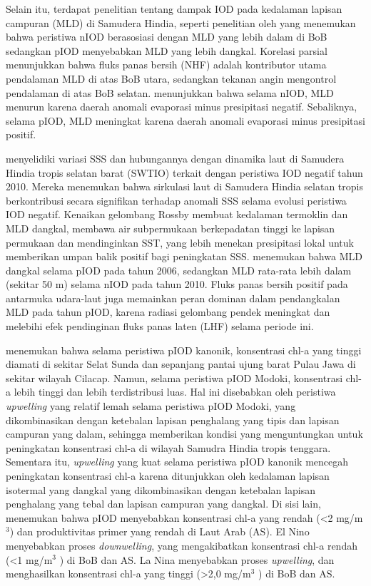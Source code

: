 \begin{spacing}{1.5}
	Selain itu, terdapat penelitian tentang dampak IOD pada kedalaman lapisan campuran (MLD) di Samudera Hindia, seperti penelitian oleh  yang menemukan bahwa peristiwa nIOD berasosiasi dengan MLD yang lebih dalam di BoB sedangkan pIOD menyebabkan MLD yang lebih dangkal. Korelasi parsial menunjukkan bahwa fluks panas bersih (NHF) adalah kontributor utama pendalaman MLD di atas BoB utara, sedangkan tekanan angin mengontrol pendalaman di atas BoB selatan.  menunjukkan bahwa selama nIOD, MLD menurun karena daerah anomali evaporasi minus presipitasi negatif. Sebaliknya, selama pIOD, MLD meningkat karena daerah anomali evaporasi minus presipitasi positif. 
	
	 menyelidiki variasi SSS dan hubungannya dengan dinamika laut di Samudera Hindia tropis selatan barat (SWTIO) terkait dengan peristiwa IOD negatif tahun 2010. Mereka menemukan bahwa sirkulasi laut di Samudera Hindia selatan tropis berkontribusi secara signifikan terhadap anomali SSS selama evolusi peristiwa IOD negatif. Kenaikan gelombang Rossby membuat kedalaman termoklin dan MLD dangkal, membawa air subpermukaan berkepadatan tinggi ke lapisan permukaan dan mendinginkan SST, yang lebih menekan presipitasi lokal untuk memberikan umpan balik positif bagi peningkatan SSS.  menemukan bahwa MLD dangkal selama pIOD pada tahun 2006, sedangkan MLD rata-rata lebih dalam (sekitar 50 m) selama nIOD pada tahun 2010. Fluks panas bersih positif pada antarmuka udara-laut juga memainkan peran dominan dalam pendangkalan MLD pada tahun pIOD, karena radiasi gelombang pendek meningkat dan melebihi efek pendinginan fluks panas laten (LHF) selama periode ini. 
	
	 menemukan bahwa selama peristiwa pIOD kanonik, konsentrasi chl-a yang tinggi diamati di sekitar Selat Sunda dan sepanjang pantai ujung barat Pulau Jawa di sekitar wilayah Cilacap. Namun, selama peristiwa pIOD Modoki, konsentrasi chl-a lebih tinggi dan lebih terdistribusi luas. Hal ini disebabkan oleh peristiwa \textit{upwelling} yang relatif lemah selama peristiwa pIOD Modoki, yang dikombinasikan dengan ketebalan lapisan penghalang yang tipis dan lapisan campuran yang dalam, sehingga memberikan kondisi yang menguntungkan untuk peningkatan konsentrasi chl-a di wilayah Samudra Hindia tropis tenggara. Sementara itu, \textit{upwelling} yang kuat selama peristiwa pIOD kanonik mencegah peningkatan konsentrasi chl-a karena ditunjukkan oleh kedalaman lapisan isotermal yang dangkal yang dikombinasikan dengan ketebalan lapisan penghalang yang tebal dan lapisan campuran yang dangkal. Di sisi lain,  menemukan bahwa pIOD menyebabkan konsentrasi chl-a yang rendah (<2 mg/m$^3$) dan produktivitas primer yang rendah di Laut Arab (AS). El Nino menyebabkan proses \textit{downwelling}, yang mengakibatkan konsentrasi chl-a rendah (<1 mg/m$^3$ ) di BoB dan AS. La Nina menyebabkan proses \textit{upwelling}, dan menghasilkan konsentrasi chl-a yang tinggi (>2,0 mg/m$^3$ ) di BoB dan AS. 
	

\end{spacing}
